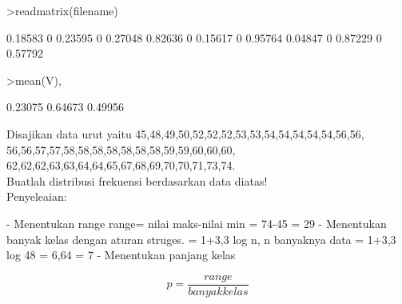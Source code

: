 \documentclass[12pt,arial,letterpaper]{book}
\begin{document}
\begin{eulercomment}
\begin{eulercomment}
\begin{eulercomment}
\begin{eulercomment}
\begin{eulercomment}
\begin{eulercomment}
\begin{eulercomment}
\begin{eulercomment}
\begin{eulercomment}
\begin{eulercomment}
\begin{eulercomment}
\begin{eulercomment}
\begin{eulercomment}
\begin{eulercomment}
\begin{eulercomment}
\begin{eulercomment}
\begin{eulercomment}
\begin{eulercomment}
\begin{eulercomment}
\begin{eulercomment}
\begin{eulercomment}
\begin{eulercomment}
\begin{eulercomment}
\begin{eulercomment}
\begin{eulercomment}
\begin{eulercomment}
\begin{eulercomment}
\begin{eulercomment}
\begin{eulercomment}
\begin{eulercomment}
\begin{eulercomment}
\begin{eulercomment}
\begin{eulercomment}
\begin{eulercomment}
\begin{eulercomment}
\begin{eulercomment}
\begin{eulercomment}
\begin{eulercomment}
\begin{euleroutput}
\end{euleroutput}
\begin{eulerprompt}
>readmatrix(filename)
\end{eulerprompt}
\begin{euleroutput}
    0.18583         0   0.23595         0   0.27048 
    0.82636         0   0.15617         0   0.95764 
    0.04847         0   0.87229         0   0.57792 
\end{euleroutput}
\begin{eulerprompt}
>mean(V),
\end{eulerprompt}
\begin{euleroutput}
    0.23075 
    0.64673 
    0.49956 
\end{euleroutput}
\begin{eulercomment}
Disajikan data urut yaitu
45,48,49,50,52,52,52,53,53,54,54,54,54,54,56,56,
56,56,57,57,58,58,58,58,58,58,58,59,59,60,60,60,
62,62,62,63,63,64,64,65,67,68,69,70,70,71,73,74.\\
Buatlah distribusi frekuensi berdasarkan data diatas!\\
Penyeleaian:\\
\end{eulercomment}
\begin{eulerttcomment}
         - Menentukan range
           range= nilai maks-nilai min
                = 74-45
                = 29
         - Menentukan banyak kelas dengan aturan
           struges.
           = 1+3,3 log n, n banyaknya data
           = 1+3,3 log 48
           = 6,64
           = 7
         - Menentukan panjang kelas
\end{eulerttcomment}
\begin{eulerformula}
\[
p=\frac {range}{banyak kelas}
\]

\end{eulerformula}
\end{eulercomment}
\end{eulercomment}
\end{eulercomment}
\end{eulercomment}
\end{eulercomment}
\end{eulercomment}
\end{eulercomment}
\end{eulercomment}
\end{eulercomment}
\end{eulercomment}
\end{eulercomment}
\end{eulercomment}
\end{eulercomment}
\end{eulercomment}
\end{eulercomment}
\end{eulercomment}
\end{eulercomment}
\end{eulercomment}
\end{eulercomment}
\end{eulercomment}
\end{eulercomment}
\end{eulercomment}
\end{eulercomment}
\end{eulercomment}
\end{eulercomment}
\end{eulercomment}
\end{eulercomment}
\end{eulercomment}
\end{eulercomment}
\end{eulercomment}
\end{eulercomment}
\end{eulercomment}
\end{eulercomment}
\end{eulercomment}
\end{eulercomment}
\end{eulercomment}
\end{eulercomment}
\end{eulercomment}
\end{document}
